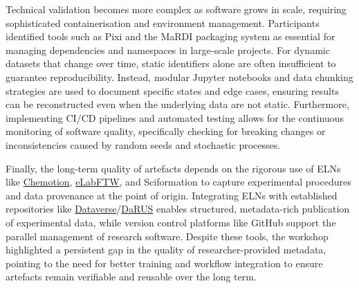 \documentclass{eceasst}
\newcommand{\elabftw}{\href{https://www.elabftw.net/}{eLabFTW}}
\begin{document}
Technical validation becomes more complex as software grows in scale, requiring sophisticated containerisation and environment management.
Participants identified tools such as Pixi and the MaRDI packaging system as essential for managing dependencies and namespaces in large-scale projects.
For dynamic datasets that change over time, static identifiers alone are often insufficient to guarantee reproducibility.
Instead, modular Jupyter notebooks and data chunking strategies are used to document specific states and edge cases, ensuring results can be reconstructed even when the underlying data are not static.
Furthermore, implementing CI/CD pipelines and automated testing allows for the continuous monitoring of software quality, specifically checking for breaking changes or inconsistencies caused by random seeds and stochastic processes.

Finally, the long-term quality of artefacts depends on the rigorous use of ELNs like \href{https://chemotion.net/}{Chemotion}, \elabftw, and Sciformation to capture  experimental procedures and data provenance at the point of origin.
Integrating ELNs with established repositories like \href{https://dataverse.org/}{Dataverse}/\href{https://darus.uni-stuttgart.de/dataverse/darus}{DaRUS} enables structured, metadata-rich publication of experimental data, while version control platforms like GitHub support the parallel management of research software.
Despite these tools, the workshop highlighted a persistent gap in the quality of researcher-provided metadata, pointing to the need for better training and workflow integration to ensure artefacts remain verifiable and reusable over the long term.
\end{document}
